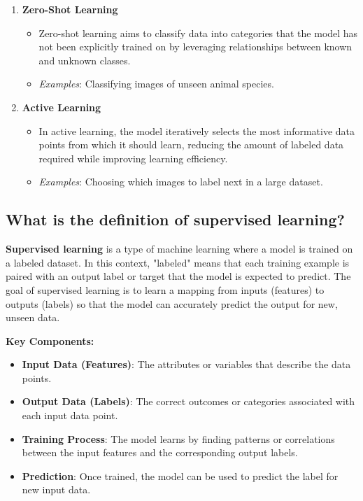 \begin{enumerate}
    \item \textbf{Zero-Shot Learning}
    \begin{itemize}
        \item Zero-shot learning aims to classify data into categories that the model has not been explicitly trained on by leveraging relationships between known and unknown classes.
        \item \textit{Examples}: Classifying images of unseen animal species.
    \end{itemize}

    \item \textbf{Active Learning}
    \begin{itemize}
        \item In active learning, the model iteratively selects the most informative data points from which it should learn, reducing the amount of labeled data required while improving learning efficiency.
        \item \textit{Examples}: Choosing which images to label next in a large dataset.
    \end{itemize}
\end{enumerate}

\subsection{What is the definition of supervised learning?}
\textbf{Supervised learning} is a type of machine learning where a model is trained on a labeled dataset. In this context, "labeled" means that each training example is paired with an output label or target that the model is expected to predict. The goal of supervised learning is to learn a mapping from inputs (features) to outputs (labels) so that the model can accurately predict the output for new, unseen data.

\textbf{Key Components:}
\begin{itemize}
    \item \textbf{Input Data (Features)}: The attributes or variables that describe the data points.
    \item \textbf{Output Data (Labels)}: The correct outcomes or categories associated with each input data point.
    \item \textbf{Training Process}: The model learns by finding patterns or correlations between the input features and the corresponding output labels.
    \item \textbf{Prediction}: Once trained, the model can be used to predict the label for new input data.
\end{itemize}

